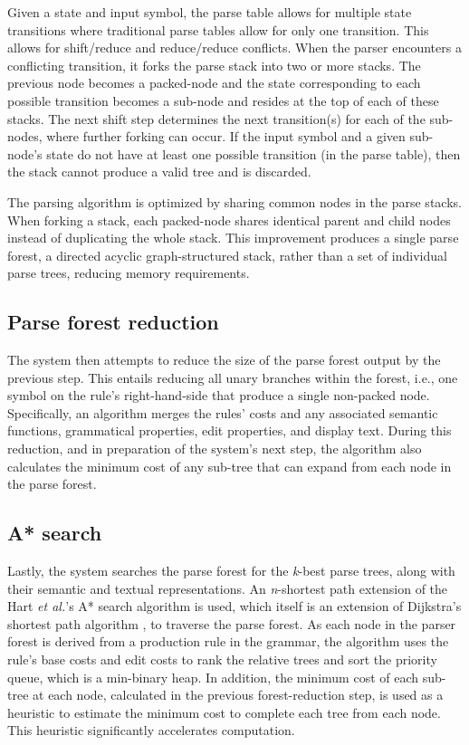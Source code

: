 \documentclass{article}
\begin{document}
Given a state and input symbol, the parse table allows for multiple state transitions where traditional parse tables allow for only one transition. This allows for shift/reduce and reduce/reduce conflicts. When the parser encounters a conflicting transition, it forks the parse stack into two or more stacks. The previous node becomes a packed-node and the state corresponding to each possible transition becomes a sub-node and resides at the top of each of these stacks. The next shift step determines the next transition(s) for each of the sub-nodes, where further forking can occur. If the input symbol and a given sub-node's state do not have at least one possible transition (in the parse table), then the stack cannot produce a valid tree and is discarded.

The parsing algorithm is optimized by sharing common nodes in the parse stacks. When forking a stack, each packed-node shares identical parent and child nodes instead of duplicating the whole stack. This improvement produces a single parse forest, a directed acyclic graph-structured stack, rather than a set of individual parse trees, reducing memory requirements.

\subsection{Parse forest reduction}
The system then attempts to reduce the size of the parse forest output by the previous step. This entails reducing all unary branches within the forest, i.e., one symbol on the rule's right-hand-side that produce a single non-packed node. Specifically, an algorithm merges the rules' costs and any associated semantic functions, grammatical properties, edit properties, and display text. During this reduction, and in preparation of the system's next step, the algorithm also calculates the minimum cost of any sub-tree that can expand from each node in the parse forest.

\subsection{A* search}
Lastly, the system searches the parse forest for the \textit{k}-best parse trees, along with their semantic and textual representations. An \textit{n}-shortest path extension of the Hart \textit{et al.}'s A* search algorithm \citep{Hart1968} is used, which itself is an extension of Dijkstra's shortest path algorithm \citep{Dijkstra1959}, to traverse the parse forest. As each node in the parser forest is derived from a production rule in the grammar, the algorithm uses the rule's base costs and edit costs to rank the relative trees and sort the priority queue, which is a min-binary heap. In addition, the minimum cost of each sub-tree at each node, calculated in the previous forest-reduction step, is used as a heuristic to estimate the minimum cost to complete each tree from each node. This heuristic significantly accelerates computation.
\end{document}

